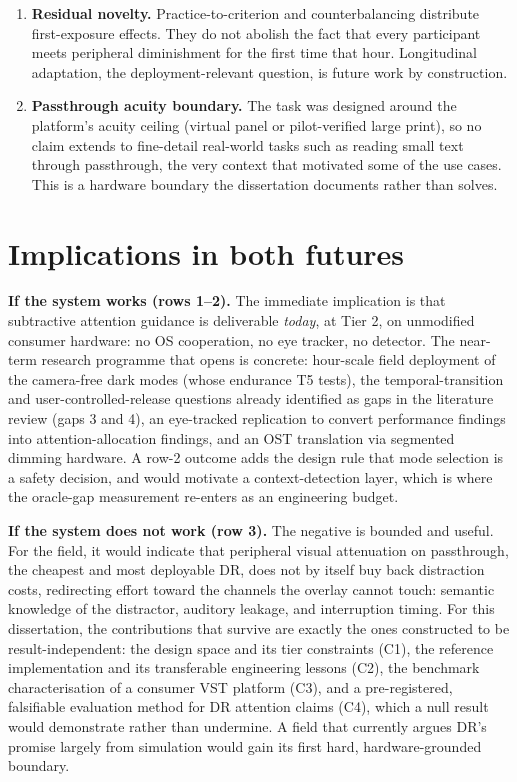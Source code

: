 \begin{enumerate}
   bursts. The monitoring stimulus is a video. The study measures attention mechanisms under
   controlled distraction, deliberately, and its conclusions end where those controls end.
\item \textbf{Residual novelty.} Practice-to-criterion and counterbalancing distribute first-exposure
   effects. They do not abolish the fact that every participant meets peripheral diminishment for
   the first time that hour. Longitudinal adaptation, the deployment-relevant question, is future
   work by construction.
\item \textbf{Passthrough acuity boundary.} The task was designed around the platform's acuity ceiling
   (virtual panel or pilot-verified large print), so no claim extends to fine-detail real-world
   tasks such as reading small text through passthrough, the very context that motivated some of
   the use cases. This is a hardware boundary the dissertation documents rather than solves.
\end{enumerate}

\section{Implications in both futures}

\textbf{If the system works (rows 1–2).} The immediate implication is that subtractive attention
guidance is deliverable \textit{today}, at Tier 2, on unmodified consumer hardware: no OS cooperation, no
eye tracker, no detector. The near-term research programme that opens is concrete: hour-scale field
deployment of the camera-free dark modes (whose endurance T5 tests), the temporal-transition
and user-controlled-release questions already identified as gaps in the literature review (gaps 3
and 4), an eye-tracked replication to convert performance findings into attention-allocation
findings, and an OST translation via segmented dimming hardware. A row-2 outcome adds the design
rule that mode selection is a safety decision, and would motivate a context-detection layer,
which is where the oracle-gap measurement re-enters as an engineering budget.

\textbf{If the system does not work (row 3).} The negative is bounded and useful. For the field, it
would indicate that peripheral visual attenuation on passthrough, the cheapest and most deployable
DR, does not by itself buy back distraction costs, redirecting effort toward the channels the
overlay cannot touch: semantic knowledge of the distractor, auditory leakage, and interruption
timing. For this dissertation, the contributions that survive are exactly the ones constructed to
be result-independent: the design space and its tier constraints (C1), the reference implementation
and its transferable engineering lessons (C2), the benchmark characterisation of a consumer VST
platform (C3), and a pre-registered, falsifiable evaluation method for DR attention claims (C4),
which a null result would demonstrate rather than undermine. A field that currently argues DR's
promise largely from simulation would gain its first hard, hardware-grounded boundary.

